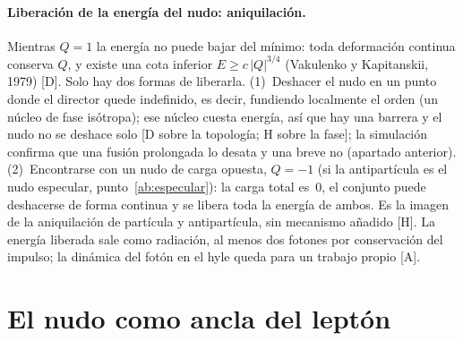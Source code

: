 \documentclass[11pt,a4paper]{article}
\newcommand{\st}[1]{\textup{[#1]}}
\newcommand{\apartado}[1]{\paragraph{#1}}
\begin{document}
\apartado{Liberación de la energía del nudo: aniquilación.} Mientras $Q=1$ la energía no puede bajar del mínimo: toda deformación continua conserva $Q$, y existe una cota inferior $E\geq c\,|Q|^{3/4}$ (Vakulenko y Kapitanskii, 1979) \st{D}. Solo hay dos formas de liberarla. (1)~Deshacer el nudo en un punto donde el director quede indefinido, es decir, fundiendo localmente el orden (un núcleo de fase isótropa); ese núcleo cuesta energía, así que hay una barrera y el nudo no se deshace solo \st{D sobre la topología; H sobre la fase}; la simulación confirma que una fusión prolongada lo desata y una breve no (apartado anterior). (2)~Encontrarse con un nudo de carga opuesta, $Q=-1$ (si la antipartícula es el nudo especular, punto~\ref{ab:especular}): la carga total es~0, el conjunto puede deshacerse de forma continua y se libera toda la energía de ambos. Es la imagen de la aniquilación de partícula y antipartícula, sin mecanismo añadido \st{H}. La energía liberada sale como radiación, al menos dos fotones por conservación del impulso; la dinámica del fotón en el hyle queda para un trabajo propio \st{A}.

\section{El nudo como ancla del leptón}\label{sec:ancla}
\end{document}
